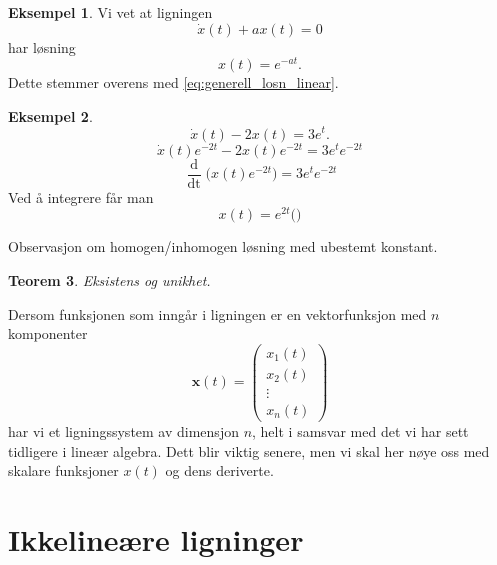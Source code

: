 \documentclass{article}
\theoremstyle{plain}
\newtheorem{teorem}{Teorem}\surroundwithmdframed{teorem}
\theoremstyle{definition}
\newtheorem{eksempel}[teorem]{Eksempel}
\theoremstyle{remark}
\newcommand{\diff}[1]{\mathop{d#1}}
\newcommand{\fcn}{x}
\newcommand{\expfcn}[1]{e^{#1}}
\newcommand{\bigparanth}[1]{\big(#1\big)}
\newcommand{\biggparanth}[1]{\bigg(#1\bigg)}
\begin{document}
\begin{eksempel}
    Vi vet at ligningen
    \begin{equation*}
        \dot{\fcn}(t) + a \fcn(t) = 0
    \end{equation*}
    har løsning
    \begin{equation*}
        \fcn(t) = \expfcn{-a t}.
    \end{equation*}
    Dette stemmer overens med \eqref{eq:generell_losn_linear}.
\end{eksempel}

\begin{eksempel}
    \begin{equation*}
        \dot{\fcn}(t) - 2\fcn(t) = 3\expfcn{t}.
    \end{equation*}
    \begin{equation*}
        \dot{\fcn}(t) \expfcn{-2t} - 2\fcn(t) \expfcn{-2t} = 3\expfcn{t} \expfcn{-2t}
    \end{equation*}
    \begin{equation*}
        \frac{\diff{}}{\diff{t}} \bigparanth{\fcn(t) \expfcn{-2t}} = 3\expfcn{t} \expfcn{-2t}
    \end{equation*}
    Ved å integrere får man
    \begin{equation*}
        x(t) = \expfcn{2t} \biggparanth{}
    \end{equation*}
\end{eksempel}


Observasjon om homogen/inhomogen løsning med ubestemt konstant.

\begin{teorem}
    Eksistens og unikhet.
\end{teorem}


Dersom funksjonen som inngår i ligningen er en vektorfunksjon med $n$ komponenter
\begin{equation*}
    \boldsymbol{x}(t) =
    \begin{pmatrix}
        x_1(t) \\
        x_2(t) \\
        \vdots \\
        x_n(t)
    \end{pmatrix}
\end{equation*}
har vi et ligningssystem av dimensjon $n$, helt i samsvar med det vi har sett tidligere i lineær algebra. Dett blir viktig senere, men vi skal her nøye oss med skalare funksjoner $\fcn(t)$ og dens deriverte.


\section*{Ikkelineære ligninger}
\end{document}
